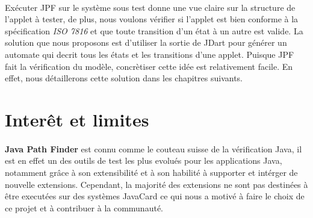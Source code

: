 		\paragraph{}
			Exécuter \gls{JPF} sur le système sous test donne une vue claire sur la structure de l'applet à tester, de plus, nous voulons
			vérifier si l'applet est bien conforme à la spécification \textit{ISO 7816} et que toute transition d'un état à un autre est valide.
			La solution que nous proposons est d'utiliser la sortie de JDart pour générer un automate qui decrit tous les états et les transitions
			d'une applet.
			Puisque \gls{JPF} fait la vérification du modèle, concrètiser cette idée est relativement facile.
			En effet, nous détaillerons cette solution dans les chapitres suivants.
			
	\section{Interêt et limites}
	\paragraph{}
		\textbf{Java Path Finder} est connu comme le couteau suisse de la vérification Java,
		il est en effet un des outils de test les plus evolués pour les applications Java,
		notamment grâce à son extensibilité et à son habilité à supporter et intérger de nouvelle extensions.
		Cependant, la majorité des extensions ne sont pas destinées à être executées sur des systèmes JavaCard ce qui nous a motivé
		à faire le choix de ce projet et à contribuer à la communauté.